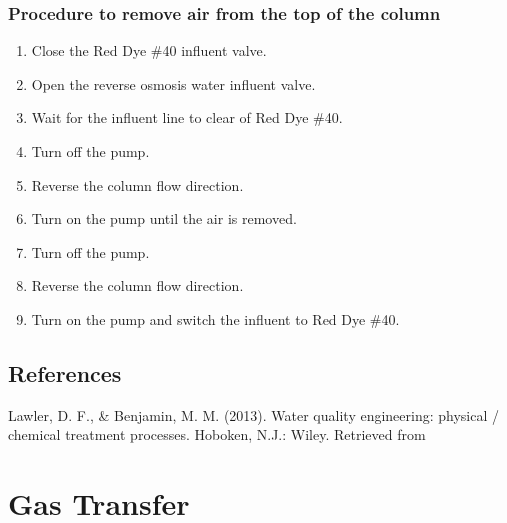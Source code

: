 \documentclass[letterpaper,10pt,english]{sphinxmanual}
\begin{document}
\subsection{Procedure to remove air from the top of the column}
\label{\detokenize{Adsorption/Adsorption:procedure-to-remove-air-from-the-top-of-the-column}}\begin{enumerate}
\item {} 
Close the Red Dye \#40 influent valve.

\item {} 
Open the reverse osmosis water influent valve.

\item {} 
Wait for the influent line to clear of Red Dye \#40.

\item {} 
Turn off the pump.

\item {} 
Reverse the column flow direction.

\item {} 
Turn on the pump until the air is removed.

\item {} 
Turn off the pump.

\item {} 
Reverse the column flow direction.

\item {} 
Turn on the pump and switch the influent to Red Dye \#40.

\end{enumerate}


\section{References}
\label{\detokenize{Adsorption/Adsorption:references}}\label{\detokenize{Adsorption/Adsorption:heading-adsorption-recommendations-from-previous-years}}
Lawler, D. F., \& Benjamin, M. M. (2013). Water quality engineering: physical / chemical treatment processes. Hoboken, N.J.: Wiley. Retrieved from 


\chapter{Gas Transfer}
\label{\detokenize{Gas_Transfer/Gas_Transfer:gas-transfer}}\label{\detokenize{Gas_Transfer/Gas_Transfer:title-gas-transfer}}\label{\detokenize{Gas_Transfer/Gas_Transfer::doc}}
\end{document}

